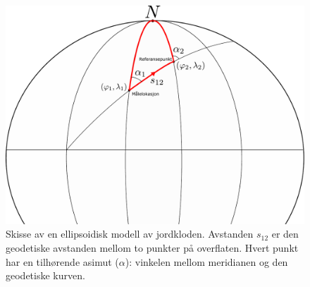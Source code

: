 \begin{figure}[h!]
    \centering
    \includegraphics[width=\textwidth, trim={0 250 0 0}, clip]{img/ellipsoidal_problem.pdf}
        \caption{Skisse av en ellipsoidisk modell av jordkloden. Avstanden $s_{12}$ er den geodetiske avstanden mellom to punkter på overflaten. Hvert punkt har en tilhørende asimut ($\alpha$): vinkelen mellom meridianen og den geodetiske kurven.}
    \label{fig:inverse_problem}
\end{figure}
